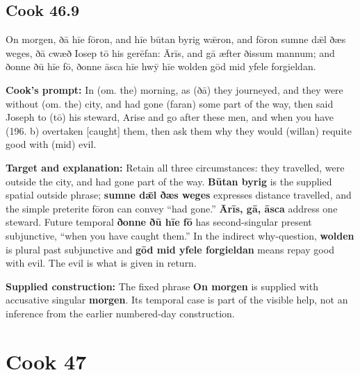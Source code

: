 \par\begin{minipage}{\linewidth}\raggedright
\subsection*{Cook 46.9}

On morgen, ðā hīe fōron, and hīe būtan byrig wǣron, and fōron sumne dǣl ðæs weges, ðā cwæð Iosep tō his gerēfan: Ārīs, and gā æfter ðissum mannum; and ðonne ðū hīe fō, ðonne āsca hīe hwȳ hīe wolden gōd mid yfele forgieldan.

\textbf{Cook’s prompt:} In (om. the) morning, as (ðā) they journeyed, and they were without (om. the) city, and had gone (faran) some part of the way, then said Joseph to (tō) his steward, Arise and go after these men, and when you have (196. b) overtaken [caught] them, then ask them why they would (willan) requite good with (mid) evil.

\textbf{Target and explanation:} Retain all three circumstances: they travelled, were outside the city, and had gone part of the way. \textbf{Būtan byrig} is the supplied spatial outside phrase; \textbf{sumne dǣl ðæs weges} expresses distance travelled, and the simple preterite fōron can convey “had gone.” \textbf{Ārīs, gā, āsca} address one steward. Future temporal \textbf{ðonne ðū hīe fō} has second-singular present subjunctive, “when you have caught them.” In the indirect why-question, \textbf{wolden} is plural past subjunctive and \textbf{gōd mid yfele forgieldan} means repay good with evil. The evil is what is given in return.

\textbf{Supplied construction:} The fixed phrase \textbf{On morgen} is supplied with accusative singular \textbf{morgen}. Its temporal case is part of the visible help, not an inference from the earlier numbered-day construction.

\end{minipage}\par\addvspace{4pt}

\clearpage
\section*{Cook 47}

